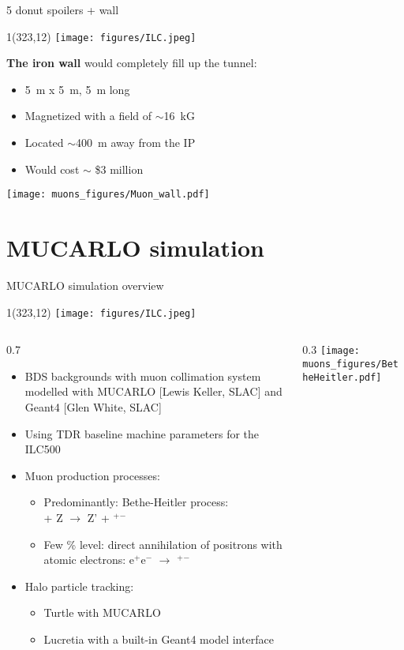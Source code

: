 \documentclass[xcolor={dvipsnames}]{beamer}
\newcommand{\ilclogo}{
  \setlength{\TPHorizModule}{1pt}
  \setlength{\TPVertModule}{1pt}
  \begin{textblock}{1}(323,12)
   \texttt{[image: figures/ILC.jpeg]}
  \end{textblock}
}
\begin{document}
\begin{frame}{5 donut spoilers + wall}
\ilclogo
\textbf{The iron wall} would completely fill up the tunnel:
\begin{itemize}
 \item \SI{5}{m} x \SI{5}{m}, \SI{5}{m} long
 \item Magnetized with a field of $\sim$\SI{16}{kG}
 \item Located $\sim$\SI{400}{m} away from the IP
 \item Would cost $\sim$ \$3 million
\end{itemize}
\begin{center}
\texttt{[image: muons\_figures/Muon\_wall.pdf]}
\end{center}
\end{frame}

\section{MUCARLO simulation}
\begin{frame}{MUCARLO simulation overview}
\ilclogo

\begin{columns}
 \begin{column}{0.7\textwidth}
  \begin{itemize}
\item BDS backgrounds with muon collimation system modelled with MUCARLO [Lewis Keller, SLAC] and Geant4 [Glen White, SLAC]
\item Using TDR baseline machine parameters for the ILC500
\item Muon production processes:
\begin{itemize}
\item Predominantly: Bethe-Heitler process:\\ \textgamma + Z $\rightarrow$ Z' + \textmu$^+$\textmu$^-$
\item Few \% level: direct annihilation of positrons with atomic electrons: e$^+$e$^-$ $\rightarrow$ \textmu$^+$\textmu$^-$
\end{itemize}
\item Halo particle tracking:
\begin{itemize}
\item Turtle with MUCARLO
\item Lucretia with a built-in Geant4 model interface
\end{itemize}
\end{itemize}

 \end{column}
 \begin{column}{0.3\textwidth}
  \texttt{[image: muons\_figures/BetheHeitler.pdf]}
 \end{column}
\end{columns}
\end{frame}
\end{document}
